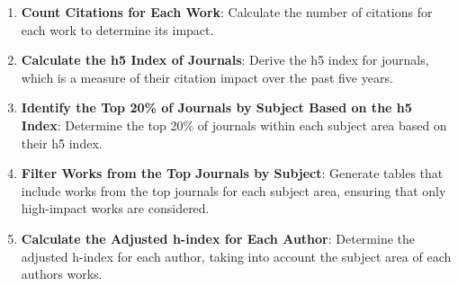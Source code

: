 \begin{enumerate}
      \item \textbf{Count Citations for Each Work}: Calculate the number of citations for each work to determine its impact.

      \item \textbf{Calculate the h5 Index of Journals}: Derive the h5 index for journals, which is a
            measure of their citation impact over the past five years.

      \item \textbf{Identify the Top 20\% of Journals by Subject Based on the h5 Index}: Determine the top 20\% of journals within
            each subject area based on their h5 index.

      \item \textbf{Filter Works from the Top Journals by Subject}: Generate tables that include works from the
            top journals for each subject area, ensuring that only high-impact works are considered.

      \item \textbf{Calculate the Adjusted h-index for Each Author}: Determine the adjusted h-index for each author,
            taking into account the subject area of each authors works.
\end{enumerate}

